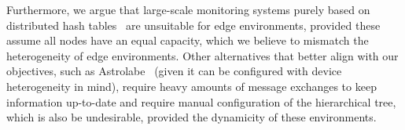 Furthermore, we argue that large-scale monitoring systems purely based on distributed hash tables~\cite{SDIMS} are unsuitable for edge environments, provided these assume all nodes have an equal capacity, which we believe to mismatch the heterogeneity of edge environments. Other  alternatives that better align with our objectives, such as Astrolabe~\cite{Renesse2003} (given it can be configured with device heterogeneity in mind), require heavy amounts of message exchanges to keep information up-to-date and require manual configuration of the hierarchical tree, which is also be undesirable, provided the dynamicity of these environments. 





    
    
